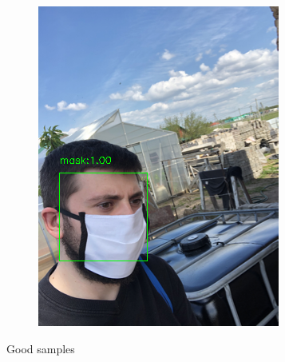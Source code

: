 \documentclass[10pt,a4paper]{report}
\begin{document}
\begin{figure}[hbtp]
\begin{subfigure}[b]{0.45\textwidth}
         \includegraphics[width=\textwidth]{./imgs/good/maksssksksss764.png}
     \end{subfigure}
\caption{Good samples}
\label{fig:good}
\end{figure}
\end{document}
